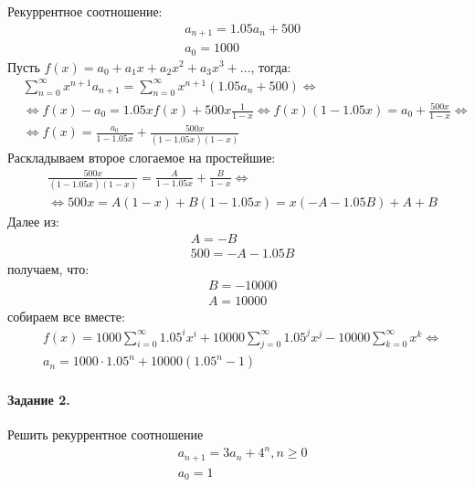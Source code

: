 \documentclass[a4paper,12pt]{article}
\begin{document}
\begin{Solution}
Рекуррентное соотношение:
\[
	\begin{split}
		& a_{n+1} = 1.05 a_{n} + 500 \\
		& a_0 = 1000
	\end{split}
\]
Пусть $f\left(x\right) = a_0 + a_1 x + a_2 x^2 + a_3 x^3 + ...$, тогда:
\[
	\begin{split}
		& \sum_{n=0}^{\infty} x^{n+1} a_{n+1} = \sum_{n=0}^{\infty} x^{n+1} \left(1.05 a_{n} + 500\right) \Leftrightarrow \\
		& \Leftrightarrow f\left(x\right) - a_0 = 1.05 x f\left(x\right) + 500 x \frac{1}{1-x} \Leftrightarrow f\left(x\right) \left(1 - 1.05x\right) = a_0 + \frac{500x}{1-x} \Leftrightarrow \\
		& \Leftrightarrow f\left(x\right) = \frac{a_0}{1 - 1.05 x} + \frac{500x}{\left(1-1.05 x\right)\left(1-x\right)}
	\end{split}
\]
Раскладываем второе слогаемое на простейшие:
\[
	\begin{split}
		& \frac{500x}{\left(1-1.05 x\right)\left(1-x\right)} = \frac{A}{1 - 1.05x} + \frac{B}{1 - x} \Leftrightarrow \\
		& \Leftrightarrow 500x = A \left(1-x\right) + B \left(1-1.05x\right) = x \left(-A - 1.05 B\right) + A + B
	\end{split}
\]
Далее из:
\[
	\begin{split}
		& A = -B \\
		& 500 = -A - 1.05 B
	\end{split}
\]
получаем, что:
\[
	\begin{split}
		& B = -10000 \\
		& A = 10000
	\end{split}
\]
собираем все вместе:
\[
	\begin{split}
		& f\left(x\right) = 1000 \sum_{i=0}^{\infty} 1.05^i x^i + 10000 \sum_{j=0}^{\infty} 1.05^j x^j - 10000 \sum_{k=0}^{\infty} x^k \Leftrightarrow \\
		& a_n = 1000 \cdot 1.05^n + 10000 \left(1.05^n - 1\right)
	\end{split}
\]
\end{Solution}

\paragraph{Задание 2.} Решить рекуррентное соотношение
\[
	\begin{split}
		& a_{n+1} = 3 a_n + 4^n , n \ge 0 \\
		& a_0 = 1
	\end{split}
\]
\end{document}
